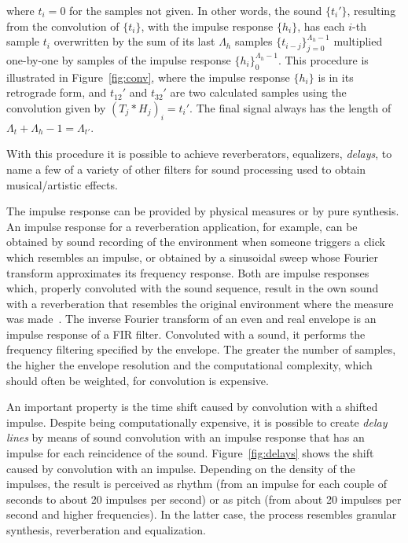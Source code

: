 \noindent where $t_i=0$ for the samples not given.
In other words, the sound $\{t_i'\}$, resulting from the convolution of $\{t_i\}$, with the impulse response $\{h_i\}$, has each $i$-th sample $t_i$ overwritten by the sum of its last $\Lambda_h$ samples $\{t_{i-j}\}_{j=0}^{\Lambda_h-1}$ multiplied one-by-one by samples of the impulse response $\{h_i\}_0^{\Lambda_h-1}$. This procedure is illustrated in Figure~\ref{fig:conv}, where the impulse response $\{h_i\}$ is in its retrograde form, and $t_{12}'$ and $t_{32}'$ are two calculated samples using the convolution given by $(T_j*H_j)_i=t_i'$. The final signal always has the length of $\Lambda_t+\Lambda_h -1=\Lambda_{t'}$.

With this procedure it is possible to achieve reverberators, equalizers, \emph{delays}, to name a few of a variety of other filters for sound processing used to obtain musical/artistic effects.

The impulse response can be provided by physical measures or by pure synthesis. An impulse response for a reverberation application, for example, can be obtained by sound recording of the environment when someone triggers a click which resembles an impulse, or obtained by a sinusoidal sweep whose Fourier transform approximates its frequency response. Both are impulse responses which, properly convoluted with the sound sequence, result in the own sound with a reverberation that resembles the original environment where the measure was made~\cite{Cook}. The inverse Fourier transform of an even and real envelope is an impulse response of a FIR filter. Convoluted with a sound, it performs the frequency filtering specified by the envelope. The greater the number of samples, the higher the envelope resolution and the computational complexity, which should often be weighted, for convolution is expensive.

An important property is the time shift caused by convolution with a shifted impulse. Despite being computationally expensive, it is possible to create \emph{delay lines} by means of sound convolution with an impulse response that has an impulse for each reincidence of the sound. Figure~\ref{fig:delays} shows the shift caused by convolution with an impulse. Depending on the density of the impulses, the result is perceived as rhythm (from an impulse for each couple of seconds to about 20 impulses per second) or as pitch (from about 20 impulses per second and higher frequencies). In the latter case, the process resembles granular synthesis, reverberation and equalization.


